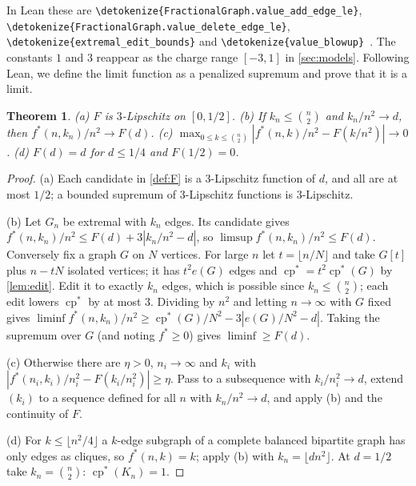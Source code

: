 \documentclass[10pt]{article}
\newtheorem{theorem}{Theorem}[section]
\theoremstyle{definition}
\newtheorem{definition}[theorem]{Definition}
\theoremstyle{remark}
\numberwithin{equation}{section}
\newcommand{\cps}{\operatorname{cp}^{*}}
\newcommand{\leanid}[1]{\expandafter\nolinkurl\expandafter{\detokenize{#1}}}
\newcommand{\Fm}[1]{\cite[#1]{Formalization}}
\begin{document}
In Lean these are \leanid{FractionalGraph.value_add_edge_le}, \leanid{FractionalGraph.value_delete_edge_le}, \leanid{extremal_edit_bounds} and \leanid{value_blowup}~\Fm{\S3}. The constants $1$ and $3$ reappear as the charge range $[-3,1]$ in \cref{sec:models}. Following Lean, we define the limit function as a penalized supremum and prove that it is a limit.


\begin{theorem}\label{thm:limit}
\textup{(a)} $F$ is $3$-Lipschitz on $[0,1/2]$. \textup{(b)} If $k_n\le\binom n2$ and $k_n/n^2\to d$, then $f^*(n,k_n)/n^2\to F(d)$. \textup{(c)} $\max_{0\le k\le\binom n2}|f^*(n,k)/n^2-F(k/n^2)|\to0$. \textup{(d)} $F(d)=d$ for $d\le1/4$ and $F(1/2)=0$.
\end{theorem}

\begin{proof}
(a) Each candidate in \cref{def:F} is a $3$-Lipschitz function of $d$, and all are at most $1/2$; a bounded supremum of $3$-Lipschitz functions is $3$-Lipschitz.

(b) Let $G_n$ be extremal with $k_n$ edges. Its candidate gives $f^*(n,k_n)/n^2\le F(d)+3|k_n/n^2-d|$, so $\limsup f^*(n,k_n)/n^2\le F(d)$. Conversely fix a graph $G$ on $N$ vertices. For large $n$ let $t=\lfloor n/N\rfloor$ and take $G[t]$ plus $n-tN$ isolated vertices; it has $t^2e(G)$ edges and $\cps=t^2\cps(G)$ by \cref{lem:edit}. Edit it to exactly $k_n$ edges, which is possible since $k_n\le\binom n2$; each edit lowers $\cps$ by at most $3$. Dividing by $n^2$ and letting $n\to\infty$ with $G$ fixed gives $\liminf f^*(n,k_n)/n^2\ge\cps(G)/N^2-3|e(G)/N^2-d|$. Taking the supremum over $G$ (and noting $f^*\ge0$) gives $\liminf\ge F(d)$.

(c) Otherwise there are $\eta>0$, $n_i\to\infty$ and $k_i$ with $|f^*(n_i,k_i)/n_i^2-F(k_i/n_i^2)|\ge\eta$. Pass to a subsequence with $k_i/n_i^2\to d$, extend $(k_i)$ to a sequence defined for all $n$ with $k_n/n^2\to d$, and apply (b) and the continuity of $F$.

(d) For $k\le\lfloor n^2/4\rfloor$ a $k$-edge subgraph of a complete balanced bipartite graph has only edges as cliques, so $f^*(n,k)=k$; apply (b) with $k_n=\lfloor dn^2\rfloor$. At $d=1/2$ take $k_n=\binom n2$: $\cps(K_n)=1$.
\end{proof}
\end{document}
